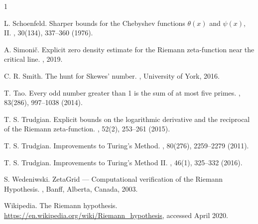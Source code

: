 \documentclass[12pt]{article}
\begin{document}
\begin{thebibliography}{1}


L. Schoenfeld.
\newblock Sharper bounds for the Chebyshev functions $\theta(x)$ and $\psi(x)$, II.
, 30(134), 337--360 (1976).

A. Simoni\v{c}.
\newblock Explicit zero density estimate for the Riemann zeta-function near the critical line.
, 2019.


C. R. Smith.
\newblock The hunt for Skewes' number.
, University of York, 2016.


T. Tao.
\newblock Every odd number greater than 1 is the sum of at most five primes.
, 83(286), 997--1038 (2014).

T. S. Trudgian.
\newblock Explicit bounds on the logarithmic derivative and the reciprocal of the Riemann zeta-function.
, 52(2), 253--261 (2015).

T. S. Trudgian.
\newblock Improvements to Turing's Method.
, 80(276), 2259--2279 (2011).

T. S. Trudgian.
\newblock Improvements to Turing's Method II.
, 46(1), 325--332 (2016).



S. Wedeniwski.
\newblock ZetaGrid --- Computational verification of the Riemann Hypothesis.
, Banff, Alberta, Canada, 2003.

Wikipedia. The Riemann hypothesis.
\newblock \url{https://en.wikipedia.org/wiki/Riemann_hypothesis}, accessed April 2020.


\end{thebibliography}



 
\end{document}
